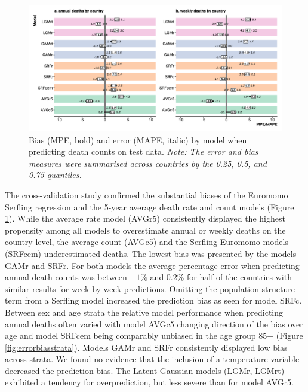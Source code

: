 \documentclass[12pt]{article}
\begin{document}

\begin{figure}
\caption{Bias (MPE, bold) and error (MAPE, italic) by model when predicting death counts on test data. \emph{Note: The error and bias measures were summarised across countries by the 0.25, 0.5, and 0.75 quantiles.}}
\label{fig:biaserror}
\includegraphics{errorbias.pdf}
\end{figure}

The cross-validation study confirmed the substantial biases of the Euromomo Serfling regression and the 5-year average death rate and count models (Figure \ref{fig:biaserror}). While the average rate model (AVGr5) consistently displayed the highest propensity among all models to overestimate annual or weekly deaths on the country level, the average count (AVGc5) and the Serfling Euromomo models (SRFcem) underestimated deaths. The lowest bias was presented by the models GAMr and SRFr. For both models the average percentage error when predicting annual death counts was between $-1\%$ and 0.2\% for half of the countries with similar results for week-by-week predictions. Omitting the population structure term from a Serfling model increased the prediction bias as seen for model SRFc. Between sex and age strata the relative model performance when predicting annual deaths often varied with model AVGc5 changing direction of the bias over age and model SRFcem being comparably unbiased in the age group 85+ (Figure \ref{fig:errorbiasstrata}). Models GAMr and SRFr consistently displayed low bias across strata. We found no evidence that the inclusion of a temperature variable decreased the prediction bias. The Latent Gaussian models (LGMr, LGMrt) exhibited a tendency for overprediction, but less severe than for model AVGr5.

\end{document}

